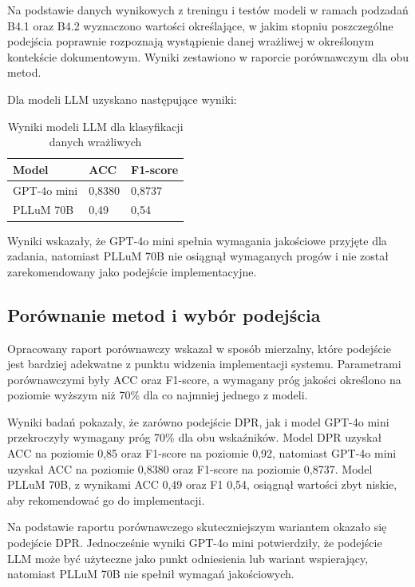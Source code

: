 \documentclass[12pt,a4paper]{report}
\begin{document}
Na podstawie danych wynikowych z treningu i testów modeli w ramach podzadań B4.1 oraz B4.2 wyznaczono wartości określające, w jakim stopniu poszczególne podejścia poprawnie rozpoznają wystąpienie danej wrażliwej w określonym kontekście dokumentowym. Wyniki zestawiono w raporcie porównawczym dla obu metod.

Dla modeli LLM uzyskano następujące wyniki:

\begin{table}[h]
    \centering
    \caption{Wyniki modeli LLM dla klasyfikacji danych wrażliwych}
    \begin{tabular}{l l l}
        \toprule
        Model & ACC & F1-score \\
        \midrule
        GPT-4o mini & 0{,}8380 & 0{,}8737 \\
        PLLuM 70B & 0{,}49 & 0{,}54 \\
        \bottomrule
    \end{tabular}
\end{table}

Wyniki wskazały, że GPT-4o mini spełnia wymagania jakościowe przyjęte dla zadania, natomiast PLLuM 70B nie osiągnął wymaganych progów i nie został zarekomendowany jako podejście implementacyjne.

\subsection{Porównanie metod i wybór podejścia}
Opracowany raport porównawczy wskazał w sposób mierzalny, które podejście jest bardziej adekwatne z punktu widzenia implementacji systemu. Parametrami porównawczymi były ACC oraz F1-score, a wymagany próg jakości określono na poziomie wyższym niż 70\% dla co najmniej jednego z modeli.

Wyniki badań pokazały, że zarówno podejście DPR, jak i model GPT-4o mini przekroczyły wymagany próg 70\% dla obu wskaźników. Model DPR uzyskał ACC na poziomie 0{,}85 oraz F1-score na poziomie 0{,}92, natomiast GPT-4o mini uzyskał ACC na poziomie 0{,}8380 oraz F1-score na poziomie 0{,}8737. Model PLLuM 70B, z wynikami ACC 0{,}49 oraz F1 0{,}54, osiągnął wartości zbyt niskie, aby rekomendować go do implementacji.

Na podstawie raportu porównawczego skuteczniejszym wariantem okazało się podejście DPR. Jednocześnie wyniki GPT-4o mini potwierdziły, że podejście LLM może być użyteczne jako punkt odniesienia lub wariant wspierający, natomiast PLLuM 70B nie spełnił wymagań jakościowych.
\end{document}
